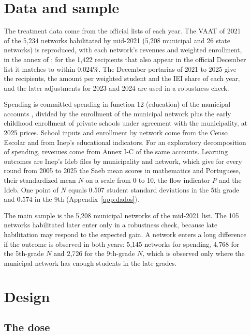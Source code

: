 \documentclass[12pt,letterpaper]{article}
\begin{document}
\section{Data and sample}\label{sec:dados}

The treatment data come from the official lists of each year. The VAAT of 2021 of the 5,234 networks habilitated by mid-2021 (5,208 municipal and 26 state networks) is reproduced, with each network's revenues and weighted enrollment, in the annex of \citet{tanno2021}; for the 1,422 recipients that also appear in the official December list it matches to within 0.024\%. The December portarias of 2021 to 2025 give the recipients, the amount per weighted student and the IEI share of each year, and the later adjustments for 2023 and 2024 are used in a robustness check.

Spending is committed spending in function 12 (education) of the municipal accounts \citep[Siconfi, DCA, Annex I-E; definition of][]{cunha2026a}, divided by the enrollment of the municipal network plus the early childhood enrollment of private schools under agreement with the municipality, at 2025 prices. School inputs and enrollment by network come from the Censo Escolar and from Inep's educational indicators. For an exploratory decomposition of spending, revenues come from Annex I-C of the same accounts. Learning outcomes are Inep's Ideb files by municipality and network, which give for every round from 2005 to 2025 the Saeb mean scores in mathematics and Portuguese, their standardized mean $N$ on a scale from 0 to 10, the flow indicator $P$ and the Ideb. One point of $N$ equals 0.507 student standard deviations in the 5th grade and 0.574 in the 9th (Appendix~\ref{app:dados}).

The main sample is the 5,208 municipal networks of the mid-2021 list. The 105 networks habilitated later enter only in a robustness check, because late habilitation may respond to the expected gain. A network enters a long difference if the outcome is observed in both years: 5,145 networks for spending, 4,768 for the 5th-grade $N$ and 2,726 for the 9th-grade $N$, which is observed only where the municipal network has enough students in the late grades.

\section{Design}\label{sec:desenho}

\subsection{The dose}
\end{document}

